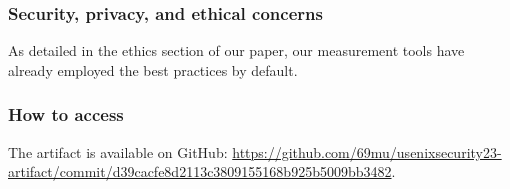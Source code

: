 
\subsubsection{Security, privacy, and ethical concerns}
As detailed in the ethics section of our paper,
our measurement tools have already employed the best practices by default.
\subsubsection{How to access}

The artifact is available on GitHub:
\url{https://github.com/69mu/usenixsecurity23-artifact/commit/d39cacfe8d2113c3809155168b925b5009bb3482}.


